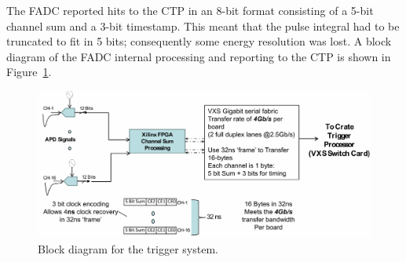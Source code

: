 The FADC reported hits to the CTP in an 8-bit format consisting of a 5-bit channel sum and a 3-bit timestamp. This meant that the pulse integral had to be truncated to fit in 5 bits; consequently some energy resolution was lost. 
A block diagram of the FADC internal processing and reporting to the CTP is shown in Figure~\ref{fig:trigger_diagram}.  
\begin{figure}[ht]
\includegraphics[scale=0.6]{test2012/trigger/HPSChanSum_001.jpg}
\caption{\small{Block diagram for the trigger system.}}
\label{fig:trigger_diagram}
\end{figure}


